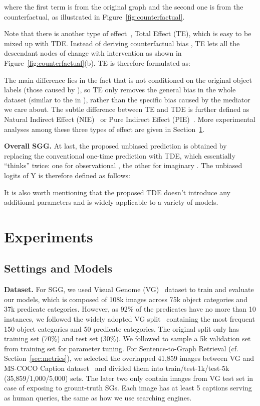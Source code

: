 \documentclass[10pt,twocolumn,letterpaper]{article}
\begin{document}
where the first term is from the original graph and the second one is from the counterfactual, as illustrated in Figure~\ref{fig:counterfactual}. 

Note that there is another type of effect~\cite{vanderweele2015explanation}, Total Effect (TE), which is easy to be mixed up with TDE. Instead of deriving counterfactual bias , TE lets all the descendant nodes of  change with intervention  as shown in Figure~\ref{fig:counterfactual}(b). TE is therefore formulated as:

The main difference lies in the fact that  is not conditioned on the original object labels (those caused by ), so TE only removes the general bias in the whole dataset (similar to the  in ), rather than the specific bias caused by the mediator we care about. The subtle difference between TE and TDE is further defined as Natural Indirect Effect (NIE)~\cite{vanderweele2015explanation} or Pure Indirect Effect (PIE)~\cite{vanderweele2013three}. More experimental analyses among these three types of effect are given in Section~\ref{sec:exp}.

\noindent\textbf{Overall SGG.} At last, the proposed unbiased prediction  is obtained by replacing the conventional one-time prediction with TDE, which essentially ``thinks'' twice: one for observational , the other for imaginary . The unbiased logits of Y is therefore defined as follows:

It is also worth mentioning that the proposed TDE doesn't introduce any additional parameters and is widely applicable to a variety of models. 
\section{Experiments}
\label{sec:exp}
\vspace{-0.05in}
\subsection{Settings and Models}
\vspace{-0.05in}
\noindent\textbf{Dataset.} For SGG, we used Visual Genome (VG)~\cite{krishna2017visual} dataset to train and evaluate our models, which is composed of 108k images across 75k object categories and 37k predicate categories. However, as 92\% of the predicates have no more than 10 instances, we followed the widely adopted VG split~\cite{xu2017scene, zellers2018neural, tang2019learning, chen2019counterfactual} containing the most frequent 150 object categories and 50 predicate categories. The original split only has training set (70\%) and test set (30\%). We followed \cite{zellers2018neural} to sample a 5k validation set from training set for parameter tuning. For Sentence-to-Graph Retrieval (cf. Section~\ref{sec:metrics}), we selected the overlapped 41,859 images between VG and MS-COCO Caption dataset~\cite{lin2014microsoft} and divided them into train/test-1k/test-5k (35,859/1,000/5,000) sets. The later two only contain images from VG test set in case of exposing to grount-truth SGs. Each image has at least 5 captions serving as human queries, the same as how we use searching engines.
\end{document}
